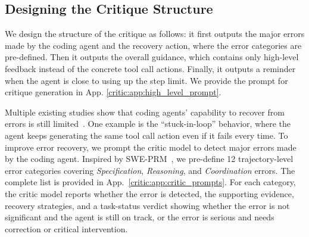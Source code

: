 \subsection{Designing the Critique Structure}
\label{critic:sec:critique_design}
We design the structure of the critique as follows: it first outputs the major errors made by the coding agent and the recovery action, where the error categories are pre-defined.
Then it outputs the overall guidance, which contains only high-level feedback instead of the concrete tool call actions.
Finally, it outputs a reminder when the agent is close to using up the step limit.
We provide the prompt for critique generation in App. \ref{critic:app:high_level_prompt}.


Multiple existing studies show that coding agents' capability to recover from errors is still limited~\cite{wang2026rubric,gandhi2025sweprm}.
One example is the ``stuck-in-loop'' behavior, where the agent keeps generating the same tool call action even if it fails every time. 
To improve error recovery, we prompt the critic model to detect major errors made by the coding agent.
Inspired by SWE-PRM~\cite{gandhi2025sweprm}, we pre-define 12 trajectory-level error categories covering \emph{Specification}, \emph{Reasoning}, and \emph{Coordination} errors. The complete list is provided in App.~\ref{critic:app:critic_prompts}.
For each category, the critic model reports whether the error is detected, the supporting evidence, recovery strategies, and a task-status verdict showing whether the error is not significant and the agent is still on track, or the error is serious and needs correction or critical intervention.

